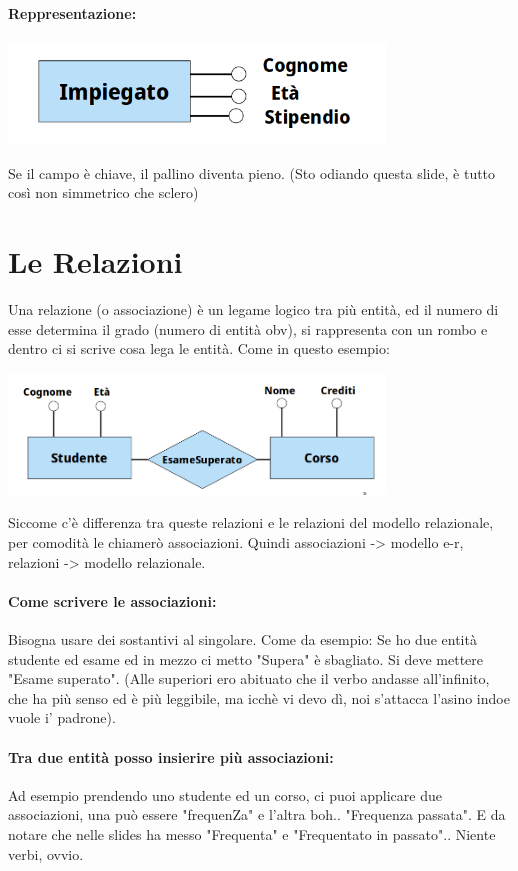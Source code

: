 \documentclass[12pt, a4paper, openany, twoside]{book}
\begin{document}
\paragraph{Reppresentazione:}
\begin{center}
\includegraphics[width=0.75\textwidth]{2.png}
\end{center}
Se il campo è chiave, il pallino diventa pieno. (Sto odiando questa slide, è 
tutto così non simmetrico che sclero)
\section{Le Relazioni}
Una relazione (o associazione) è un legame logico tra più entità, ed il numero
di esse determina il grado (numero di entità obv), si rappresenta con un rombo
e dentro ci si scrive cosa lega le entità. Come in questo esempio:
\begin{center}
\includegraphics[width=0.75\textwidth]{3.png}
\end{center}
Siccome c'è differenza tra queste relazioni e le relazioni del modello relazionale,
per comodità le chiamerò associazioni. Quindi associazioni -> modello e-r, relazioni ->
modello relazionale.
\paragraph{Come scrivere le associazioni:} Bisogna usare dei sostantivi al 
singolare. Come da esempio: Se ho due entità studente ed esame ed in mezzo ci
metto "Supera" è sbagliato. Si deve mettere "Esame superato". (Alle superiori
ero abituato che il verbo andasse all'infinito, che ha più senso ed è più 
leggibile, ma icchè vi devo dì, noi s'attacca l'asino indoe vuole i' padrone).
\paragraph{Tra due entità posso insierire più associazioni:} Ad esempio prendendo
uno studente ed un corso, ci puoi applicare due associazioni, una può essere
"frequenZa" e l'altra boh.. "Frequenza passata". E da notare che nelle slides 
ha messo "Frequenta" e "Frequentato in passato".. Niente verbi, ovvio.
\end{document}
